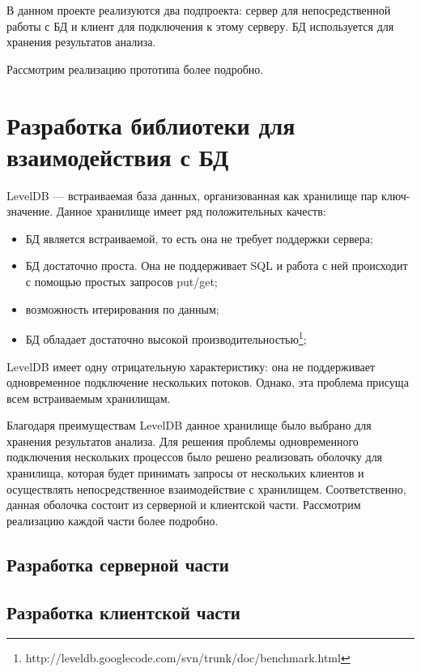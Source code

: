 В данном проекте реализуются два подпроекта: сервер для непосредственной работы с БД и клиент для подключения к этому серверу. БД используется для хранения результатов анализа.

Рассмотрим реализацию прототипа более подробно.

\section{Разработка библиотеки для взаимодействия с БД}
LevelDB --- встраиваемая база данных, организованная как хранилище пар ключ-значение. Данное хранилище имеет ряд положительных качеств:
\begin{itemize}
\item БД является встраиваемой, то есть она не требует поддержки сервера;
\item БД достаточно проста. Она не поддерживает SQL и работа с ней происходит с помощью простых запросов put/get;
\item возможность итерирования по данным;
\item БД обладает достаточно высокой производительностью\footnote{http://leveldb.googlecode.com/svn/trunk/doc/benchmark.html};
\end{itemize}

LevelDB имеет одну отрицательную характеристику: она не поддерживает одновременное подключение нескольких потоков. Однако, эта проблема присуща всем встраиваемым хранилищам.

Благодаря преимуществам LevelDB данное хранилище было выбрано для хранения результатов анализа. Для решения проблемы одновременного подключения нескольких процессов было решено реализовать оболочку для хранилища, которая будет принимать запросы от нескольких клиентов и осуществлять непосредственное взаимодействие с хранилищем. Соответственно, данная оболочка состоит из серверной и клиентской части. Рассмотрим реализацию каждой части более подробно.

\subsection{Разработка серверной части}
\subsection{Разработка клиентской части}
